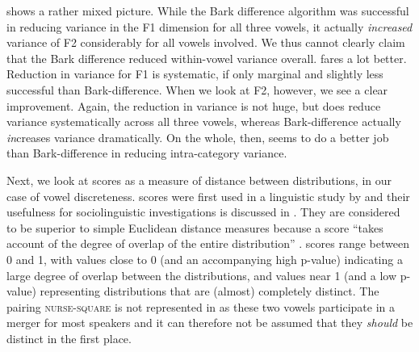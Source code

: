  shows a rather mixed picture. While the Bark difference algorithm was successful in reducing variance in the F1 dimension for all three vowels, it actually \emph{increased} variance of F2 considerably for all vowels involved. We thus cannot clearly claim that the Bark difference  reduced within-vowel variance overall.
\citeauthor{wattfabricius2002} fares a lot better.
Reduction in variance for F1 is systematic, if only marginal and slightly less successful than Bark-difference.
When we look at F2, however, we see a clear improvement.
Again, the reduction in variance is not huge, but \citeauthor{wattfabricius2002} does reduce variance systematically across all three vowels, whereas Bark-difference actually \emph{in}creases variance dramatically.
On the whole, then, \citeauthor{wattfabricius2002} seems to do a better job than Bark-difference in reducing intra-category variance.

Next, we look at  scores as a measure of distance between distributions, in our case of vowel discreteness.
 scores were first used in a linguistic study by \textcite{hayetal2006b} and their usefulness for sociolinguistic investigations is discussed in \citealt{halllew2010}.
They are considered to be superior to simple Euclidean distance measures because a  score ``takes account of the degree of overlap of the entire distribution'' \parencite[467]{hayetal2006b}.
 scores range between 0 and 1, with values close to 0 (and an accompanying high p-value) indicating a large degree of overlap between the distributions, and values near 1 (and a low p-value) representing distributions that are (almost) completely distinct.
The pairing \textsc{nurse-square} is not represented in  as these two vowels participate in a merger for most speakers and it can therefore not be assumed that they \emph{should} be distinct in the first place.

